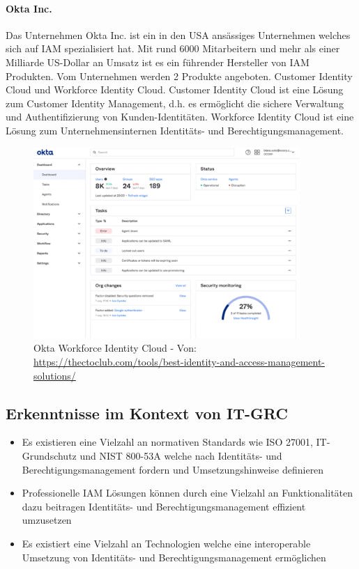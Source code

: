 \documentclass[11pt]{article}
\begin{document}
\paragraph{Okta Inc.}
Das Unternehmen Okta Inc. ist ein in den USA ansässiges Unternehmen welches sich auf IAM spezialisiert hat. Mit rund 6000 Mitarbeitern und mehr als einer Milliarde US-Dollar an Umsatz ist es ein führender Hersteller von IAM Produkten. Vom Unternehmen werden 2 Produkte angeboten. Customer Identity Cloud und Workforce Identity Cloud. Customer Identity Cloud ist eine Lösung zum Customer Identity Management, d.h. es ermöglicht die sichere Verwaltung und Authentifizierung von Kunden-Identitäten. Workforce Identity Cloud ist eine Lösung zum Unternehmensinternen Identitäts- und Berechtigungsmanagement.
\begin{figure}[H]
  \centering
  \includegraphics[width=0.9\textwidth]{assets/Workforce.png}
  \caption{Okta Workforce Identity Cloud - Von: \url{https://thectoclub.com/tools/best-identity-and-access-management-solutions/}}\label{figure:okta}
\end{figure}
\subsection{Erkenntnisse im Kontext von IT-GRC}
\begin{itemize}
  \item Es existieren eine Vielzahl an normativen Standards wie ISO 27001, IT-Grundschutz und NIST 800-53A welche nach Identitäts- und Berechtigungsmanagement fordern und Umsetzungshinweise definieren
  \item Professionelle IAM Lösungen können durch eine Vielzahl an Funktionalitäten dazu beitragen Identitäts- und Berechtigungsmanagement effizient umzusetzen
  \item Es existiert eine Vielzahl an Technologien welche eine interoperable Umsetzung von Identitäts- und Berechtigungsmanagement ermöglichen
\end{itemize}
\end{document}
